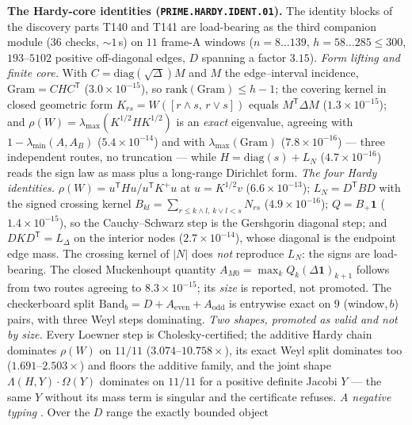 \par\smallskip\noindent\textbf{The Hardy-core identities
(\texttt{PRIME.HARDY.IDENT.01}).}
The identity blocks of the discovery parts T140 and T141 are load-bearing as the
third companion module ($36$ checks, ${\sim}1$\,s) on $11$ frame-A windows ($n=8\ldots139$, $h=58\ldots285\le300$,
$193$--$5102$ positive off-diagonal edges, $D$ spanning a factor $3.15$).
\emph{Form lifting and finite core.} With $C=\mathrm{diag}(\sqrt\Delta)M$ and $M$
the edge--interval incidence, $\mathrm{Gram}=CHC^{\mathsf T}$
($3.0\times10^{-15}$), so $\mathrm{rank}(\mathrm{Gram})\le h-1$; the covering
kernel in closed geometric form $K_{rs}=W([r\wedge s,\,r\vee s])$ equals
$M^{\mathsf T}\Delta M$ ($1.3\times10^{-15}$); and
$\rho(W)=\lambda_{\max}(K^{1/2}HK^{1/2})$ is an \emph{exact} eigenvalue, agreeing
with $1-\lambda_{\min}(A,A_B)$ ($5.4\times10^{-14}$) and with
$\lambda_{\max}(\mathrm{Gram})$ ($7.8\times10^{-16}$) --- three independent routes,
no truncation --- while $H=\mathrm{diag}(s)+L_N$ ($4.7\times10^{-16}$) reads the
sign law as mass plus a long-range Dirichlet form.
\emph{The four Hardy identities.} $\rho(W)=u^{\mathsf T}Hu/u^{\mathsf T}K^{+}u$ at
$u=K^{1/2}v$ ($6.6\times10^{-13}$); $L_N=D^{\mathsf T}BD$ with the signed crossing
kernel $B_{kl}=\sum_{r\le k\wedge l,\,k\vee l<s}N_{rs}$ ($4.9\times10^{-16}$);
$Q=B_+\mathbf 1$ ($1.4\times10^{-15}$), so the Cauchy--Schwarz step is the
Gershgorin diagonal step; and $DKD^{\mathsf T}=L_\Delta$ on the interior nodes
($2.7\times10^{-14}$), whose diagonal is the endpoint edge mass. The crossing
kernel of $|N|$ does \emph{not} reproduce $L_N$: the signs are load-bearing. The
closed Muckenhoupt quantity $A_{M0}=\max_kQ_k(\Delta\mathbf 1)_{k+1}$ follows from
two routes agreeing to $8.3\times10^{-15}$; its \emph{size} is reported, not
promoted. The checkerboard split $\mathrm{Band}_b=D+A_{\mathrm{even}}+A_{\mathrm{odd}}$
is entrywise exact on $9$ (window,\,$b$) pairs, with three Weyl steps dominating.
\emph{Two shapes, promoted as valid and not by size.} Every Loewner step is
Cholesky-certified; the additive Hardy chain dominates $\rho(W)$ on $11/11$
($3.074$--$10.758\times$), its exact Weyl split dominates too
($1.691$--$2.503\times$) and floors the additive family, and the joint shape
$\Lambda(H,Y)\cdot\Omega(Y)$ dominates on $11/11$ for a positive definite Jacobi
$Y$ --- the same $Y$ without its mass term is singular and the certificate refuses.
\emph{A negative typing} \mX. Over the $D$ range the exactly bounded object
